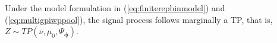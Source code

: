\begin{proposition}
\label{prop:marginalsignal}
Under the model formulation in (\ref{eq:finiterepbinmodel}) and (\ref{eq:multigpiwppool}),
the signal process follows marginally a TP, that is, 
$Z\sim TP(\nu,\mu_0,\Psi_{\boldsymbol{\phi}})$.
\end{proposition}





